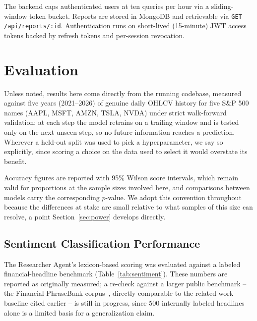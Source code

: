 \documentclass[conference]{IEEEtran}
\begin{document}
The backend caps authenticated users at ten queries per hour via a sliding-window token bucket. Reports are stored in MongoDB and retrievable via \texttt{GET /api/reports/:id}. Authentication runs on short-lived (15-minute) JWT access tokens backed by refresh tokens and per-session revocation.

\section{Evaluation}
\label{sec:evaluation}

Unless noted, results here come directly from the running codebase, measured against five years (2021--2026) of genuine daily OHLCV history for five S\&P 500 names (AAPL, MSFT, AMZN, TSLA, NVDA) under strict walk-forward validation: at each step the model retrains on a trailing window and is tested only on the next unseen step, so no future information reaches a prediction. Wherever a held-out split was used to pick a hyperparameter, we say so explicitly, since scoring a choice on the data used to select it would overstate its benefit.

Accuracy figures are reported with 95\% Wilson score intervals, which remain valid for proportions at the sample sizes involved here, and comparisons between models carry the corresponding $p$-value. We adopt this convention throughout because the differences at stake are small relative to what samples of this size can resolve, a point Section~\ref{sec:power} develops directly.

\subsection{Sentiment Classification Performance}

The Researcher Agent's lexicon-based scoring was evaluated against a labeled financial-headline benchmark (Table~\ref{tab:sentiment}). These numbers are reported as originally measured; a re-check against a larger public benchmark -- the Financial PhraseBank corpus~\cite{sun2025financial}, directly comparable to the related-work baseline cited earlier -- is still in progress, since 500 internally labeled headlines alone is a limited basis for a generalization claim.
\end{document}
